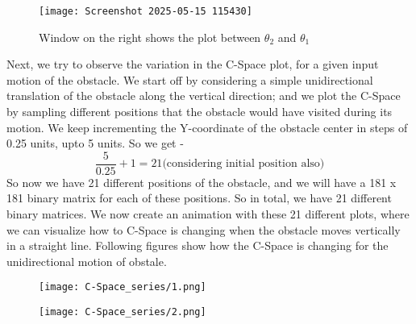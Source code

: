 \documentclass[12pt]{article}
\begin{document}
\begin{figure}[h]
    \centering
    \texttt{[image: Screenshot 2025-05-15 115430]}
    \caption{Window on the right shows the plot between $\theta_2$ and $\theta_1$}
    \label{fig:1}
\end{figure}
\newline
Next, we try to observe the variation in the C-Space plot, for a given input motion of the obstacle. We start off by considering a simple unidirectional translation of the obstacle along the vertical direction; and we plot the C-Space by sampling different positions that the obstacle would have visited during its motion. We keep incrementing the Y-coordinate of the obstacle center in steps of 0.25 units, upto 5 units. So we get - 
\[
\frac{5}{0.25} + 1 = 21 \text{(considering initial position also)}
\]
So now we have 21 different positions of the obstacle, and we will have a 181 x 181 binary matrix for each of these positions. So in total, we have 21 different binary matrices. We now create an animation with these 21 different plots, where we can visualize how to C-Space is changing when the obstacle moves vertically in a straight line. Following figures show how the C-Space is changing for the unidirectional motion of obstale.
\begin{figure}[h]
    \centering

    \begin{minipage}{0.48\textwidth}
        \centering
        \texttt{[image: C-Space\_series/1.png]}
    \end{minipage}
    \hfill
    \begin{minipage}{0.48\textwidth}
        \centering
        \texttt{[image: C-Space\_series/2.png]}
    \end{minipage}

\end{figure}
\clearpage  %
\end{document}

